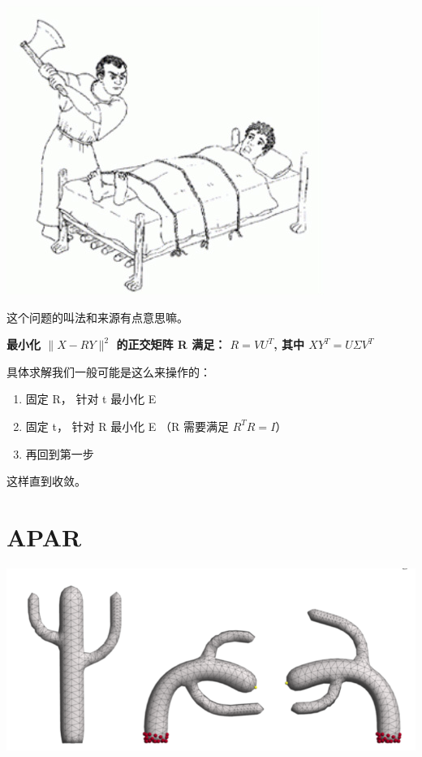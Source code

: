 \documentclass[
]{book}
\providecommand{\tightlist}{%
  \setlength{\itemsep}{0pt}\setlength{\parskip}{0pt}}
\begin{document}
\includegraphics{images/Procrustes.jpg}

这个问题的叫法和来源有点意思嘛。

\textbf{最小化 \(\parallel X - RY \parallel ^2\) 的正交矩阵 R 满足： \(R = VU^T\), 其中 \(XY^T = U \Sigma V^T\)}

具体求解我们一般可能是这么来操作的：

\begin{enumerate}
\def\labelenumi{\arabic{enumi}.}
\tightlist
\item
  固定 R， 针对 t 最小化 E
\item
  固定 t， 针对 R 最小化 E （R 需要满足 \(R^TR = I\)）
\item
  再回到第一步
\end{enumerate}

这样直到收敛。

\hypertarget{apar}{%
\section{APAR}\label{apar}}

\includegraphics{images/APAR_01.png}
\end{document}
